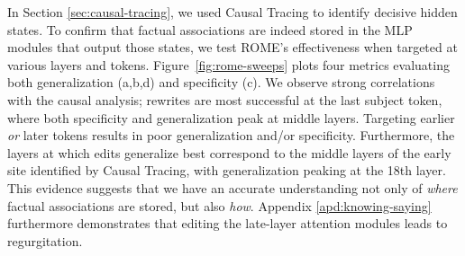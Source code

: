 \documentclass{article}
\newcommand{\method}{ROME\xspace}
\newcommand{\reffig}[1]{Figure~\ref{fig:#1}}
\begin{document}
In Section \ref{sec:causal-tracing}, we used Causal Tracing to identify decisive hidden states. To confirm that factual associations are indeed stored in the MLP modules that output those states, we test \method's effectiveness when targeted at various layers and tokens.
\reffig{rome-sweeps} plots four metrics evaluating both generalization (a,b,d) and specificity (c). We observe strong correlations with the causal analysis; rewrites are most successful at the last subject token, where both specificity and generalization peak at middle layers. Targeting earlier \textit{or} later tokens results in poor generalization and/or specificity. Furthermore, the layers at which edits generalize best correspond to the middle layers of the early site identified by Causal Tracing, with generalization peaking at the 18th layer. This evidence suggests that we have an accurate understanding not only of \textit{where} factual associations are stored, but also \textit{how}. Appendix \ref{apd:knowing-saying} furthermore demonstrates that editing the late-layer attention modules leads to regurgitation.


\addtolength{\tabcolsep}{2pt}
\end{document}
